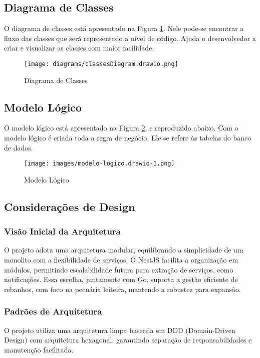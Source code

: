 \documentclass[12pt, a4paper]{article}
\begin{document}
\subsection{Diagrama de Classes}
\begin{spacing}{1.5}
O diagrama de classes está apresentado na Figura \ref{fig:classes-diagram}. Nele pode-se encontrar a fluxo das classes que será representado a nível de código. Ajuda o desenvolvedor a criar e visualizar as classes com maior facilidade.
\begin{figure}[H]
    \centering
    \texttt{[image: diagrams/classesDiagram.drawio.png]}
    \caption{Diagrama de Classes}
    \label{fig:classes-diagram}
\end{figure}
\end{spacing}

\subsection{Modelo Lógico}
\begin{spacing}{1.5}
O modelo lógico está apresentado na Figura \ref{fig:entity-relationship}, e reproduzido abaixo. Com o modelo lógico é criada toda a regra de negócio. Ele se refere às tabelas do banco de dados.
\begin{figure}[H]
\centering
\texttt{[image: images/modelo-logico.drawio-1.png]}
\caption{Modelo Lógico}
\label{fig:entity-relationship}
\end{figure}
\end{spacing}

\subsection{Considerações de Design}
\subsubsection{Visão Inicial da Arquitetura}
\begin{spacing}{1.5}
O projeto adota uma arquitetura modular, equilibrando a simplicidade de um monolito com a flexibilidade de serviços. O NestJS facilita a organização em módulos, permitindo escalabilidade futura para extração de serviços, como notificações. Essa escolha, juntamente com Go, suporta a gestão eficiente de rebanhos, com foco na pecuária leiteira, mantendo a robustez para expansão.
\end{spacing}

\subsubsection{Padrões de Arquitetura}
\begin{spacing}{1.5}
O projeto utiliza uma arquitetura limpa baseada em DDD (Domain-Driven Design) com arquitetura hexagonal, garantindo separação de responsabilidades e manutenção facilitada.
\end{spacing}
\end{document}
